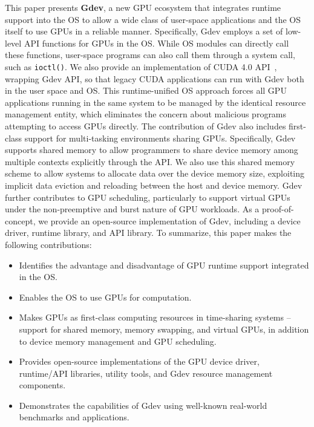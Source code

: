 This paper presents \textbf{Gdev}, a new GPU ecosystem that integrates
runtime support into the OS to allow a wide class of user-space
applications and the OS itself to use GPUs in a reliable manner.
Specifically, Gdev employs a set of low-level API functions for GPUs in
the OS.
While OS modules can directly call these functions, user-space
programs can also call them through a system call, such as
\texttt{ioctl()}.
We also provide an implementation of CUDA 4.0 API~\cite{CUDA40},
wrapping Gdev API, so that legacy CUDA applications can run with Gdev
both in the user space and OS. 
This runtime-unified OS approach forces all GPU applications running in
the same system to be managed by the identical resource management
entity, which eliminates the concern about malicious programs attempting
to access GPUs directly.
The contribution of Gdev also includes first-class support for
multi-tasking environments sharing GPUs.
Specifically, Gdev supports shared memory to allow programmers to
share device memory among multiple contexts explicitly through the API.
We also use this shared memory scheme to allow systems to allocate data
over the device memory size, exploiting implicit data eviction and
reloading between the host and device memory.
Gdev further contributes to GPU scheduling, particularly
to support virtual GPUs under the non-preemptive and burst nature of GPU
workloads.
As a proof-of-concept, we provide an open-source implementation of Gdev,
including a device driver, runtime library, and API library.
To summarize, this paper makes the following contributions:
\begin{itemize}
 \vspace{-0.25em}
 \item Identifies the advantage and disadvantage of GPU runtime support
       integrated in the OS.
 \vspace{-0.5em}
 \item Enables the OS to use GPUs for computation.
 \vspace{-0.5em}
 \item Makes GPUs as first-class computing resources in time-sharing
       systems -- support for shared memory, memory swapping,
       and virtual GPUs, in addition to device memory management and GPU
       scheduling.
 \vspace{-0.5em}
 \item Provides open-source implementations of the GPU device driver,
       runtime/API libraries, utility tools, and Gdev resource
       management components.
 \vspace{-0.5em}
 \item Demonstrates the capabilities of Gdev using well-known real-world
       benchmarks and applications.
 \vspace{-0.25em}
\end{itemize}

